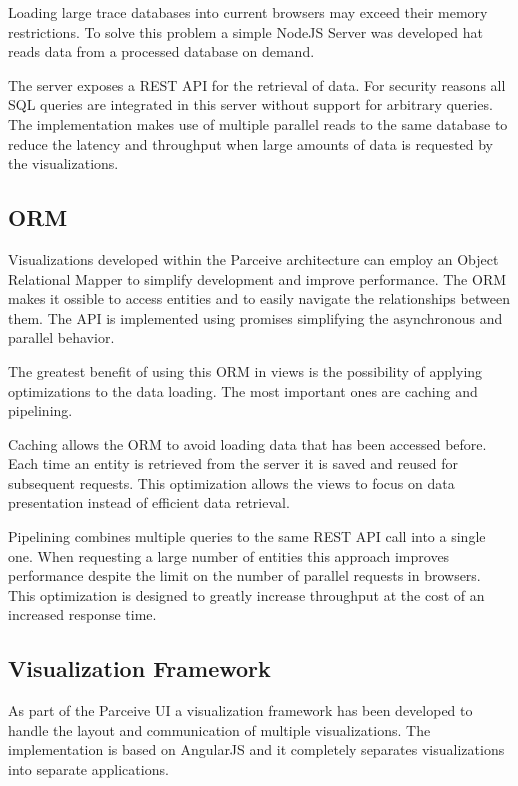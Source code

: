 Loading large trace databases into current browsers may exceed their memory restrictions. To solve this problem a simple NodeJS Server was developed hat reads data from a processed database on demand.

The server exposes a REST \cite{rest} API for the retrieval of data. For security reasons all SQL queries are integrated in this server without support for arbitrary queries. The implementation makes use of multiple parallel reads to the same database to reduce the latency and throughput when large amounts of data is requested by the visualizations.

\subsection{ORM}

Visualizations developed within the Parceive architecture can employ an Object Relational Mapper to simplify development and improve performance. The ORM makes it ossible to access entities and to easily navigate the relationships between them. The API is implemented using promises \cite{promises} simplifying the asynchronous and parallel behavior.

The greatest benefit of using this ORM in views is the possibility of applying optimizations to the data loading. The most important ones are caching and pipelining.

Caching allows the ORM to avoid loading data that has been accessed before. Each time an entity is retrieved from the server it is saved and reused for subsequent requests. This optimization allows the views to focus on data presentation instead of efficient data retrieval.

Pipelining combines multiple queries to the same REST API call into a single one. When requesting a large number of entities this approach improves performance despite the limit on the number of parallel requests in browsers. This optimization is designed to greatly increase throughput at the cost of an increased response time.

\subsection{Visualization Framework}

As part of the Parceive UI a visualization framework has been developed to handle the layout and communication of multiple visualizations. The implementation is based on AngularJS and it completely separates visualizations into separate applications.

